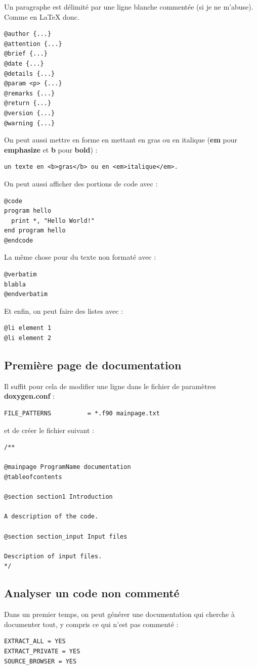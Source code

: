 \documentclass[a4paper,twoside]{article}
\begin{document}
Un paragraphe est délimité par une ligne blanche commentée (si je ne m'abuse). Comme en \LaTeX{} donc.

\begin{verbatim}
@author {...}
@attention {...}
@brief {...}
@date {...}
@details {...}
@param <p> {...}
@remarks {...}
@return {...}
@version {...}
@warning {...}
\end{verbatim}

On peut aussi mettre en forme en mettant en gras ou en italique (\textbf{em} pour \textbf{emphasize} et \textbf{b} pour \textbf{bold}) : 
\begin{verbatim}
un texte en <b>gras</b> ou en <em>italique</em>.
\end{verbatim}

\bigskip

On peut aussi afficher des portions de code avec : 
\begin{verbatim}
@code
program hello
  print *, "Hello World!"
end program hello
@endcode
\end{verbatim}

La même chose pour du texte non formaté avec : 
\begin{verbatim}
@verbatim
blabla
@endverbatim
\end{verbatim}

Et enfin, on peut faire des listes avec :
\begin{verbatim}
@li element 1
@li element 2
\end{verbatim}

\subsection{Première page de documentation}
Il suffit pour cela de modifier une ligne dans le fichier de paramètres \textbf{doxygen.conf} : 
\begin{verbatim}
FILE_PATTERNS          = *.f90 mainpage.txt
\end{verbatim}
et de créer le fichier suivant : 
\begin{verbatim}
/**

@mainpage ProgramName documentation
@tableofcontents

@section section1 Introduction

A description of the code.

@section section_input Input files

Description of input files.
*/
\end{verbatim}

\subsection{Analyser un code non commenté}
Dans un premier temps, on peut générer une documentation qui cherche à documenter tout, y compris ce qui n'est pas commenté : 
\begin{verbatim}
EXTRACT_ALL = YES
EXTRACT_PRIVATE = YES
SOURCE_BROWSER = YES
\end{verbatim}
\end{document}
